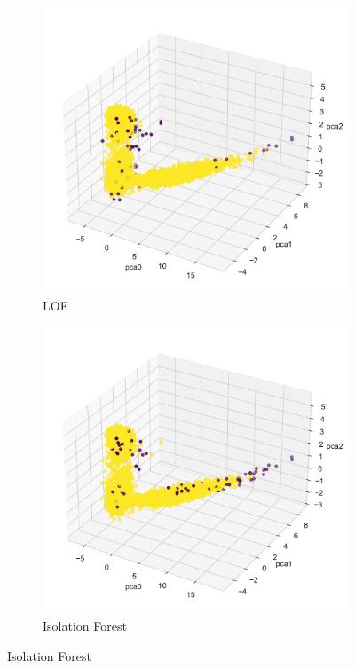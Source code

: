 \documentclass[10pt, a4paper, twocolumn]{article}
\begin{document}
\begin{figure}
\addtocounter{subfigure}{-3}
  \begin{subfigure}[t]{0.49\columnwidth}
    \includegraphics[width=\linewidth]{immagini Lia/LOF_anomaly_detection.pdf}
    \caption{LOF}
    \label{fig:lof}
  \end{subfigure}
  \hfill %
  \addtocounter{subfigure}{2}
    \begin{subfigure}[t]{0.49\columnwidth}
    \includegraphics[width=\linewidth]{immagini Lia/Iso_anomaly_detection.pdf}
    \caption{Isolation Forest}
    \label{fig:iso}
  \end{subfigure}


\end{figure}
\end{document}
